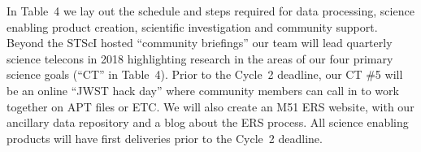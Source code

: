 \documentclass[12pt]{article}
\begin{document}
\vspace{-0.3in}
\analysisplan %
\vspace{-0.1in}
In Table~4 we lay out the schedule and steps required for data processing, science enabling product creation, scientific investigation and community support.  Beyond the STScI hosted ``community briefings'' our team will lead quarterly science telecons in 2018 highlighting research in the areas of our four primary science goals (``CT'' in Table~4).  Prior to the Cycle~2 deadline, our CT \#5 will be an online ``JWST hack day'' where community members can call in to work together on APT files or ETC. We will also create an M51 ERS website, with our ancillary data repository and a blog about the ERS process. All science enabling products will have first deliveries prior to the Cycle~2 deadline.

\end{document}
